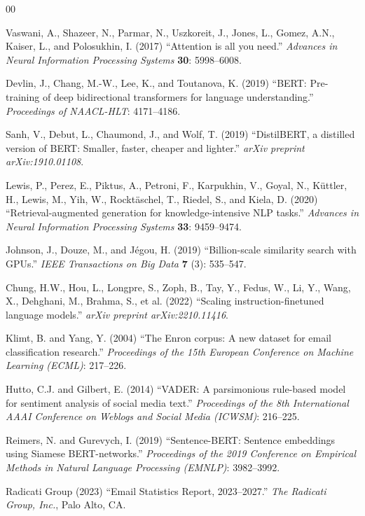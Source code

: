 \documentclass[3p,times,procedia]{elsarticle}
\begin{document}
\begin{thebibliography}{00}

Vaswani, A., Shazeer, N., Parmar, N., Uszkoreit, J., Jones, L., Gomez, A.N., Kaiser, L., and Polosukhin, I. (2017) ``Attention is all you need.'' {\it Advances in Neural Information Processing Systems} {\bf 30}: 5998--6008.

Devlin, J., Chang, M.-W., Lee, K., and Toutanova, K. (2019) ``BERT: Pre-training of deep bidirectional transformers for language understanding.'' {\it Proceedings of NAACL-HLT}: 4171--4186.

Sanh, V., Debut, L., Chaumond, J., and Wolf, T. (2019) ``DistilBERT, a distilled version of BERT: Smaller, faster, cheaper and lighter.'' {\it arXiv preprint arXiv:1910.01108}.

Lewis, P., Perez, E., Piktus, A., Petroni, F., Karpukhin, V., Goyal, N., K\"{u}ttler, H., Lewis, M., Yih, W., Rockt\"{a}schel, T., Riedel, S., and Kiela, D. (2020) ``Retrieval-augmented generation for knowledge-intensive NLP tasks.'' {\it Advances in Neural Information Processing Systems} {\bf 33}: 9459--9474.

Johnson, J., Douze, M., and J\'{e}gou, H. (2019) ``Billion-scale similarity search with GPUs.'' {\it IEEE Transactions on Big Data} {\bf 7} (3): 535--547.

Chung, H.W., Hou, L., Longpre, S., Zoph, B., Tay, Y., Fedus, W., Li, Y., Wang, X., Dehghani, M., Brahma, S., et al. (2022) ``Scaling instruction-finetuned language models.'' {\it arXiv preprint arXiv:2210.11416}.

Klimt, B. and Yang, Y. (2004) ``The Enron corpus: A new dataset for email classification research.'' {\it Proceedings of the 15th European Conference on Machine Learning (ECML)}: 217--226.

Hutto, C.J. and Gilbert, E. (2014) ``VADER: A parsimonious rule-based model for sentiment analysis of social media text.'' {\it Proceedings of the 8th International AAAI Conference on Weblogs and Social Media (ICWSM)}: 216--225.

Reimers, N. and Gurevych, I. (2019) ``Sentence-BERT: Sentence embeddings using Siamese BERT-networks.'' {\it Proceedings of the 2019 Conference on Empirical Methods in Natural Language Processing (EMNLP)}: 3982--3992.

Radicati Group (2023) ``Email Statistics Report, 2023--2027.'' {\it The Radicati Group, Inc.}, Palo Alto, CA.


\end{thebibliography}
\end{document}
